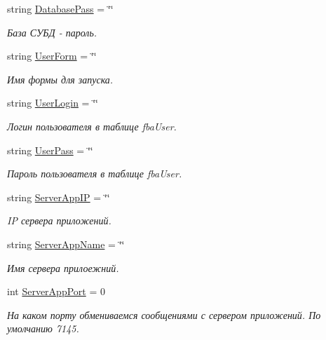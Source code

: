 \begin{DoxyCompactItemize}
string \mbox{\hyperlink{class_f_b_a_1_1_connection_afb9f211ad33869d0d3ff480a8593cba0}{Database\+Pass}} = \char`\"{}\char`\"{}
\begin{DoxyCompactList}\small\item\em База СУБД -\/ пароль. ~\newline
\end{DoxyCompactList}\item 
string \mbox{\hyperlink{class_f_b_a_1_1_connection_a6ce212094097c98af886a3417b1510cc}{User\+Form}} = \char`\"{}\char`\"{}
\begin{DoxyCompactList}\small\item\em Имя формы для запуска. ~\newline
\end{DoxyCompactList}\item 
string \mbox{\hyperlink{class_f_b_a_1_1_connection_a4da6cc26b934f060dc0c3ca79e9791d0}{User\+Login}} = \char`\"{}\char`\"{}
\begin{DoxyCompactList}\small\item\em Логин пользователя в таблице fba\+User. ~\newline
\end{DoxyCompactList}\item 
string \mbox{\hyperlink{class_f_b_a_1_1_connection_a9b58e4b1c4ca9af6571431806c0e17a9}{User\+Pass}} = \char`\"{}\char`\"{}
\begin{DoxyCompactList}\small\item\em Пароль пользователя в таблице fba\+User. ~\newline
\end{DoxyCompactList}\item 
string \mbox{\hyperlink{class_f_b_a_1_1_connection_a24c27a6a036bb03da1bbe1cdd29b1f16}{Server\+App\+IP}} = \char`\"{}\char`\"{}
\begin{DoxyCompactList}\small\item\em IP сервера приложений. \end{DoxyCompactList}\item 
string \mbox{\hyperlink{class_f_b_a_1_1_connection_af8d3357489e91efcf98ebf7b56110348}{Server\+App\+Name}} = \char`\"{}\char`\"{}
\begin{DoxyCompactList}\small\item\em Имя сервера прилоежний. \end{DoxyCompactList}\item 
int \mbox{\hyperlink{class_f_b_a_1_1_connection_a556479c8ba68bce8cee63c53e8583c14}{Server\+App\+Port}} = 0
\begin{DoxyCompactList}\small\item\em На каком порту обмениваемся сообщениями с сервером приложений. По умолчанию 7145. \end{DoxyCompactList}\item 

\end{DoxyCompactItemize}
